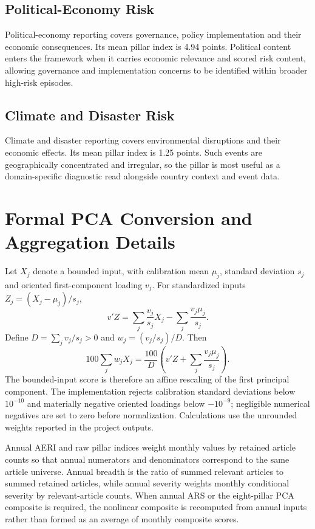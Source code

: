 \documentclass[11pt]{article}
\begin{document}
\subsection{Political-Economy Risk}
Political-economy reporting covers governance, policy implementation and their economic consequences. Its mean pillar index is 4.94 points. Political content enters the framework when it carries economic relevance and scored risk content, allowing governance and implementation concerns to be identified within broader high-risk episodes.

\subsection{Climate and Disaster Risk}
Climate and disaster reporting covers environmental disruptions and their economic effects. Its mean pillar index is 1.25 points. Such events are geographically concentrated and irregular, so the pillar is most useful as a domain-specific diagnostic read alongside country context and event data.

\section{Formal PCA Conversion and Aggregation Details}
Let $X_j$ denote a bounded input, with calibration mean $\mu_j$, standard deviation $s_j$ and oriented first-component loading $v_j$. For standardized inputs $Z_j=(X_j-\mu_j)/s_j$,
\begin{equation}
 v'Z=\sum_j \frac{v_j}{s_j}X_j-\sum_j\frac{v_j\mu_j}{s_j}.
\end{equation}
Define $D=\sum_j v_j/s_j>0$ and $w_j=(v_j/s_j)/D$. Then
\begin{equation}
100\sum_jw_jX_j=\frac{100}{D}\left(v'Z+\sum_j\frac{v_j\mu_j}{s_j}\right).
\end{equation}
The bounded-input score is therefore an affine rescaling of the first principal component. The implementation rejects calibration standard deviations below $10^{-10}$ and materially negative oriented loadings below $-10^{-9}$; negligible numerical negatives are set to zero before normalization. Calculations use the unrounded weights reported in the project outputs.

Annual AERI and raw pillar indices weight monthly values by retained article counts so that annual numerators and denominators correspond to the same article universe. Annual breadth is the ratio of summed relevant articles to summed retained articles, while annual severity weights monthly conditional severity by relevant-article counts. When annual ARS or the eight-pillar PCA composite is required, the nonlinear composite is recomputed from annual inputs rather than formed as an average of monthly composite scores.
\end{document}
